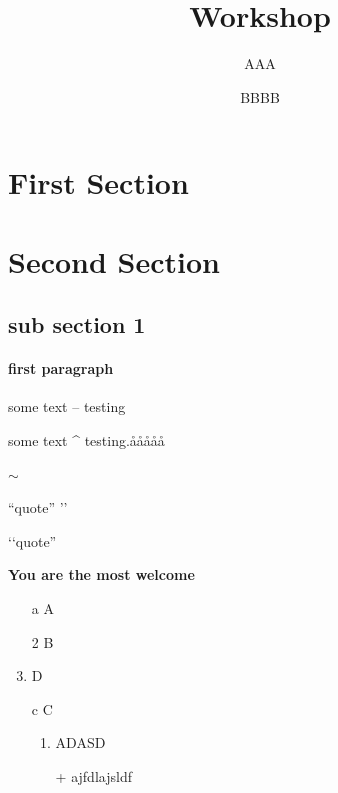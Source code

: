 \documentclass[a4paper,10pt]{article}
\title{Workshop}
\author{AAA   
					\and BBBB}
\begin{document}
	\maketitle
	
	\tableofcontents

\section[other name]{First Section}
\section{Second Section}
	\subsection{sub section 1}
		\paragraph{first paragraph}
			some text  -- testing %
			
			
			some text \^{ } testing.ååååå
			
			$\sim$
			
			``quote'' \rq\rq
			
			
			\pagebreak %
			\newpage %
			
			\lq\lq quote''
			~  %
			

			
			{
			\rmfamily
			\bfseries
			You are the most welcome
			}
			
			
			\begin{enumerate}
				\item[a] A
				\item[2] B
				\item D
				\item[c] C
				\begin{enumerate}
					\item ADASD
				\end{enumerate}
				\begin{itemize}
					\item [+]ajfdlajsldf
				\end{itemize}
			\end{enumerate}
			
\end{document}
